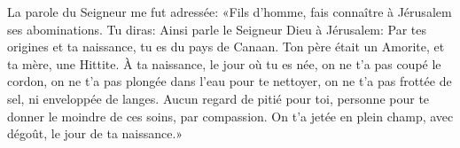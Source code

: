 La parole du Seigneur me fut adressée:
	«Fils d’homme, fais connaître à Jérusalem ses abominations.
Tu diras: Ainsi parle le Seigneur Dieu à Jérusalem:
	Par tes origines et ta naissance, tu es du pays de Canaan.
	Ton père était un Amorite, et ta mère, une Hittite.
À ta naissance, le jour où tu es née,
	on ne t’a pas coupé le cordon, on ne t’a pas plongée dans l’eau pour te nettoyer,
	on ne t’a pas frottée de sel, ni enveloppée de langes.
Aucun regard de pitié pour toi,
	personne pour te donner le moindre de ces soins, par compassion.
On t’a jetée en plein champ, avec dégoût, le jour de ta naissance.»
